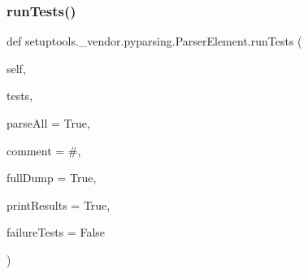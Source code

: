 \subsubsection{\texorpdfstring{run\+Tests()}{runTests()}}
{\footnotesize\ttfamily def setuptools.\+\_\+vendor.\+pyparsing.\+Parser\+Element.\+run\+Tests (\begin{DoxyParamCaption}\item[{}]{self,  }\item[{}]{tests,  }\item[{}]{parse\+All = {\ttfamily True},  }\item[{}]{comment = {\ttfamily \textquotesingle{}\#\textquotesingle{}},  }\item[{}]{full\+Dump = {\ttfamily True},  }\item[{}]{print\+Results = {\ttfamily True},  }\item[{}]{failure\+Tests = {\ttfamily False} }\end{DoxyParamCaption})}

